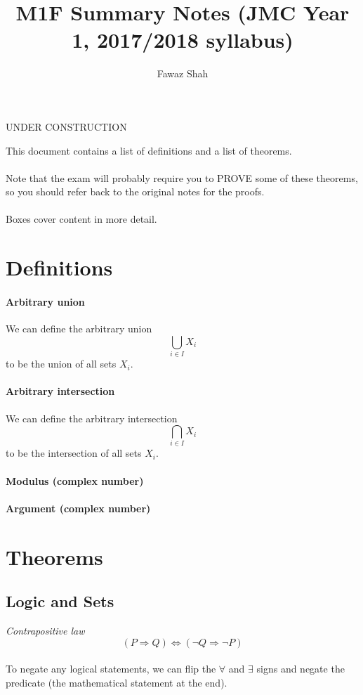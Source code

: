 \documentclass{article}
\title{M1F Summary Notes (JMC Year 1, 2017/2018 syllabus)}
\date{}
\author{Fawaz Shah}
\begin{document}
\large
\maketitle
\begin{center}
UNDER CONSTRUCTION
\end{center}
\noindent This document contains a list of definitions and a list of theorems.
\\\\
Note that the exam will probably require you to PROVE some of these theorems, so you should refer back to the original notes for the proofs.
\\\\
Boxes cover content in more detail.
\tableofcontents
\newpage

\section{Definitions}
\paragraph{Arbitrary union}
We can define the arbitrary union
\begin{equation}
\bigcup_{i \in I} X_{i}
\end{equation}
to be the union of all sets $ X_{i} $.
\paragraph{Arbitrary intersection}
We can define the arbitrary intersection
\begin{equation}
\bigcap_{i \in I} X_{i}
\end{equation}
to be the intersection of all sets $ X_{i} $.
\paragraph{Modulus (complex number)}
\paragraph{Argument (complex number)}

\section{Theorems}
\subsection{Logic and Sets}
\textit{Contrapositive law}
\begin{equation}
(P \Rightarrow Q) \Leftrightarrow (\neg Q \Rightarrow \neg P)
\end{equation}
\\
To negate any logical statements, we can flip the $ \forall $ and $ \exists $ signs and negate the predicate (the mathematical statement at the end).
\end{document}
